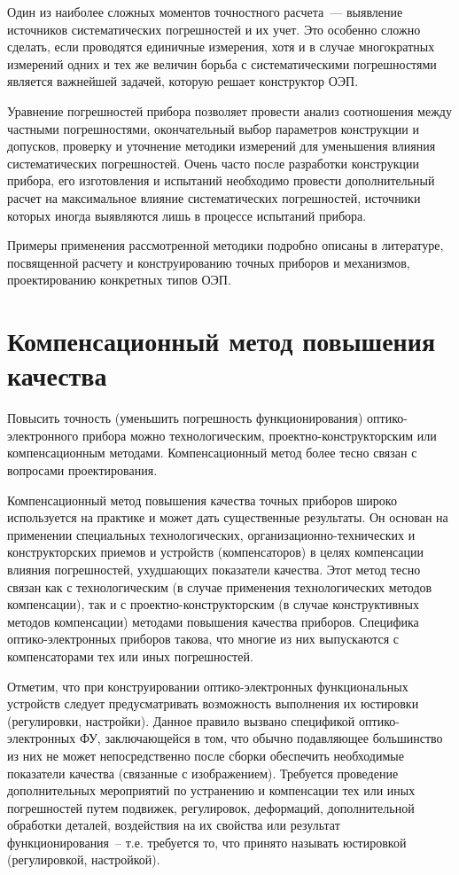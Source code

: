 Один из наиболее сложных моментов точностного расчета~--- выявление источников систематических погрешностей и их учет. Это особенно сложно сделать, если проводятся единичные измерения, хотя и в случае многократных измерений одних и тех же величин борьба с систематическими погрешностями является важнейшей задачей, которую решает конструктор ОЭП.

Уравнение погрешностей прибора позволяет провести анализ соотношения между частными погрешностями, окончательный выбор параметров конструкции и допусков, проверку и уточнение методики измерений для уменьшения влияния систематических погрешностей. Очень часто после разработки конструкции прибора, его изготовления и испытаний необходимо провести дополнительный расчет на максимальное влияние систематических погрешностей, источники которых иногда выявляются лишь в процессе испытаний прибора.

Примеры применения рассмотренной методики подробно описаны в литературе, посвященной расчету и конструированию точных приборов и механизмов, проектированию конкретных типов ОЭП.

\section{Компенсационный метод повышения качества}

Повысить точность (уменьшить погрешность функционирования) оптико-электронного прибора можно технологическим, проектно-конструкторским или компенсационным методами. Компенсационный метод более тесно связан с вопросами проектирования.

Компенсационный метод повышения качества точных приборов широко используется на практике и может дать существенные результаты. Он основан на применении специальных технологических, организационно-технических и конструкторских приемов и устройств (компенсаторов) в целях компенсации влияния погрешностей, ухудшающих показатели качества. Этот метод тесно связан как с технологическим (в случае применения технологических методов компенсации), так и с проектно-конструкторским (в случае конструктивных методов компенсации) методами повышения качества приборов. Специфика оптико-электронных приборов такова, что многие из них выпускаются с компенсаторами тех или иных погрешностей.

Отметим, что при конструировании оптико-электронных функциональных устройств следует предусматривать возможность выполнения их юстировки (регулировки, настройки). Данное правило вызвано спецификой оптико-электронных ФУ, заключающейся в том, что обычно подавляющее большинство из них не может непосредственно после сборки обеспечить необходимые показатели качества (связанные с изображением). Требуется проведение дополнительных мероприятий по устранению и компенсации тех или иных погрешностей путем подвижек, регулировок, деформаций, дополнительной обработки деталей, воздействия на их свойства или результат функционирования~-- т.е. требуется то, что принято называть юстировкой (регулировкой, настройкой).

